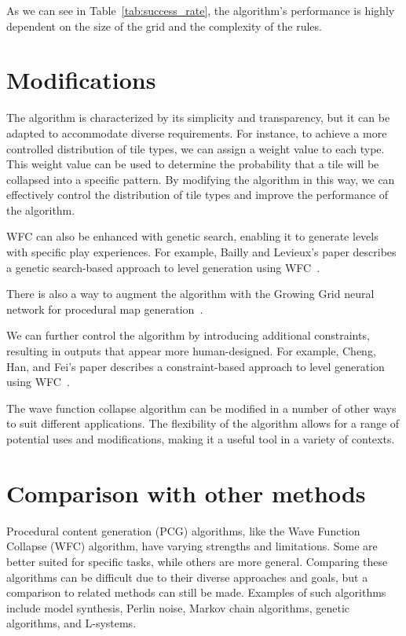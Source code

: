 \documentclass[10pt,oneside,a4paper]{article}
\begin{document}
As we can see in Table~\ref{tab:success_rate}, the algorithm's performance is highly dependent on the size of the grid and the complexity of the rules.

\newpage
\section{Modifications}\label{sec:modifications}
The algorithm is characterized by its simplicity and transparency, but it can be adapted to accommodate diverse requirements.
For instance, to achieve a more controlled distribution of tile types, we can assign a weight value to each type.
This weight value can be used to determine the probability that a tile will be collapsed into a specific pattern.
By modifying the algorithm in this way, we can effectively control the distribution of tile types and improve the performance of the algorithm.

WFC can also be enhanced with genetic search, enabling it to generate levels with specific play experiences.
For example, Bailly and Levieux's paper describes a genetic search-based approach to level generation using WFC~\cite{BL22}.

There is also a way to augment the algorithm with the Growing Grid neural network for procedural map generation~\cite{NMBP20}.

We can further control the algorithm by introducing additional constraints, resulting in outputs that appear more human-designed.
For example, Cheng, Han, and Fei's paper describes a constraint-based approach to level generation using WFC~\cite{CHF20}.

The wave function collapse algorithm can be modified in a number of other ways to suit different applications.
The flexibility of the algorithm allows for a range of potential uses and modifications, making it a useful tool in a variety of contexts.

\section{Comparison with other methods}\label{sec:comparison}

Procedural content generation (PCG) algorithms, like the Wave Function Collapse (WFC) algorithm, have varying strengths and limitations.
Some are better suited for specific tasks, while others are more general.
Comparing these algorithms can be difficult due to their diverse approaches and goals, but a comparison to related methods can still be made.
Examples of such algorithms include model synthesis, Perlin noise, Markov chain algorithms, genetic algorithms, and L-systems.
\end{document}
